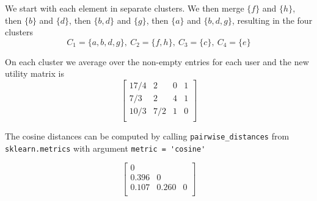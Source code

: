 \documentclass{article}
\begin{document}
We start with each element in separate clusters.
We then merge \(\{f\}\) and \(\{h\}\),
then \(\{b\}\) and \(\{d\}\),
then \(\{b, d\}\) and \(\{g\}\),
then \(\{a\}\) and \(\{b,d,g\}\),
resulting in the four clusters
\begin{equation*}
    C_1 = \{a,b,d,g\},\ C_2 = \{f,h\},\ C_3 = \{c\},\ C_4 = \{e\}
\end{equation*}

On each cluster we average over the non-empty entries for each user
and the new utility matrix is
\begin{equation*}
    \begin{bmatrix}
        17/4 & 2 & 0 & 1\\
        7/3 & 2 & 4 & 1\\
        10/3 & 7/2 & 1 & 0\\
    \end{bmatrix}
\end{equation*}

The cosine distances can be computed by calling
\verb|pairwise_distances| from 
\verb|sklearn.metrics|
with argument \verb|metric = 'cosine'|

\begin{equation*}
    \begin{bmatrix}
        0\\
        0.396 & 0\\
        0.107 & 0.260 & 0\\
    \end{bmatrix}
\end{equation*}






\end{document}
